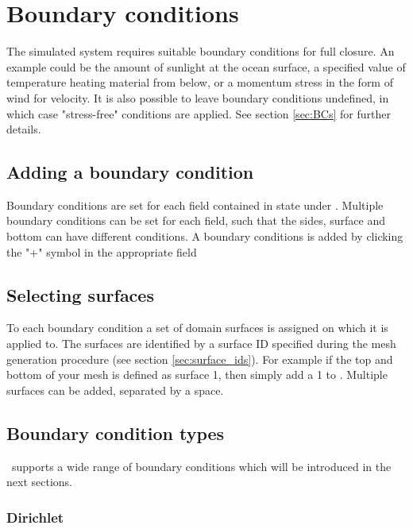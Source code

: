\section{Boundary conditions}\label{Sec:BCs_configure}


The simulated system requires suitable boundary conditions for full closure.
An example could be the amount of sunlight at the ocean surface, a specified value of
temperature heating material from below, or a momentum stress in the form of wind for velocity.
It is also possible to leave boundary conditions undefined, in which case "stress-free" conditions are
applied. See section \ref{sec:BCs} for further details.

\subsection{Adding a boundary condition}\label{sec:BCs:adding}

Boundary conditions are set for each field contained in state under .
Multiple boundary conditions can be set for each field, such that the sides, surface and bottom can
have different conditions. A boundary conditions is added by clicking the "+" symbol
in the appropriate field

\subsection{Selecting surfaces}\label{sec:BCs:selecting}
To each boundary condition a set of domain surfaces is assigned on which it is applied to. The surfaces are identified by a surface ID specified during the mesh generation procedure (see section \ref{sec:surface_ids}). For example if the top and bottom of your mesh is defined as surface
1, then simply add a 1 to . Multiple surfaces
can be added, separated by a space.

\subsection{Boundary condition types}\label{sec:BCs:types}
\fluidity\ supports a wide range of boundary conditions which will be introduced in the next sections.

\subsubsection{Dirichlet}

